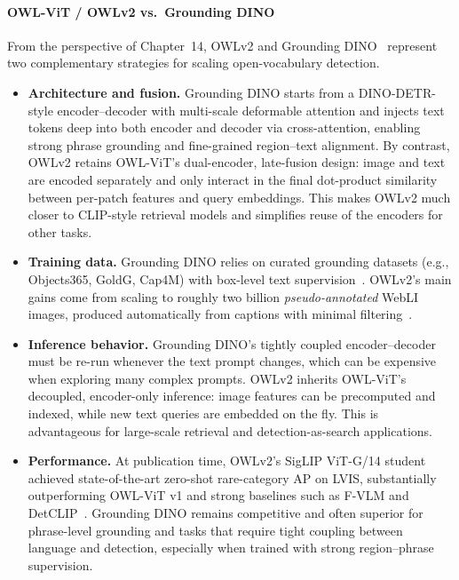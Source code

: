 \begin{enrichment}
\begin{enrichment}
	\end{enrichment}
	
	\newpage
	
	\begin{enrichment}
		
		\paragraph{OWL-ViT / OWLv2 vs.\ Grounding DINO}
		From the perspective of Chapter~14, OWLv2 and Grounding DINO~\cite{liu2023_groundingdino} represent two complementary strategies for scaling open-vocabulary detection.
		\begin{itemize}
			\item \textbf{Architecture and fusion.} Grounding DINO starts from a DINO-DETR-style encoder--decoder with multi-scale deformable attention and injects text tokens deep into both encoder and decoder via cross-attention, enabling strong phrase grounding and fine-grained region--text alignment.
			By contrast, OWLv2 retains OWL-ViT’s dual-encoder, late-fusion design: image and text are encoded separately and only interact in the final dot-product similarity between per-patch features and query embeddings.
			This makes OWLv2 much closer to CLIP-style retrieval models and simplifies reuse of the encoders for other tasks.
			\item \textbf{Training data.} Grounding DINO relies on curated grounding datasets (e.g., Objects365, GoldG, Cap4M) with box-level text supervision~\cite{liu2023_groundingdino}.
			OWLv2’s main gains come from scaling to roughly two billion \emph{pseudo-annotated} WebLI images, produced automatically from captions with minimal filtering~\cite{minderer2024_owlvitv2}.
			
			\item \textbf{Inference behavior.} Grounding DINO’s tightly coupled encoder--decoder must be re-run whenever the text prompt changes, which can be expensive when exploring many complex prompts.
			OWLv2 inherits OWL-ViT’s decoupled, encoder-only inference: image features can be precomputed and indexed, while new text queries are embedded on the fly.
			This is advantageous for large-scale retrieval and detection-as-search applications.
			\item \textbf{Performance.} At publication time, OWLv2’s SigLIP ViT-G/14 student achieved state-of-the-art zero-shot rare-category AP on LVIS, substantially outperforming OWL-ViT v1 and strong baselines such as F-VLM and DetCLIP~\cite{kuo2023_fvlm,yao2022_detclip,minderer2024_owlvitv2}.
			Grounding DINO remains competitive and often superior for phrase-level grounding and tasks that require tight coupling between language and detection, especially when trained with strong region--phrase supervision.
		\end{itemize}
		

\end{enrichment}
\end{enrichment}
